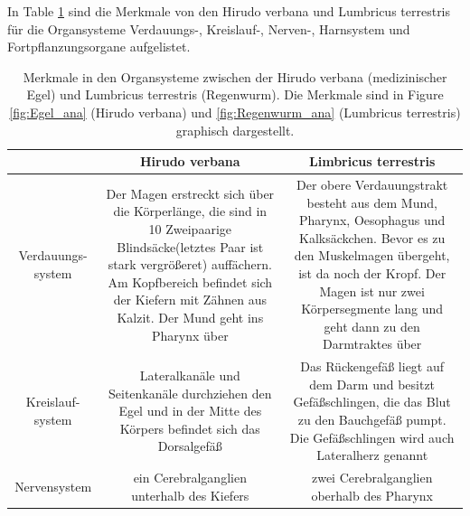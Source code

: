 \documentclass[oneside,10pt,a4paper]{report}
\begin{document}
				In Table \ref{tab: Egel vs Regenwurm} sind die Merkmale von den Hirudo verbana und Lumbricus terrestris für die Organsysteme Verdauungs-, Kreislauf-, Nerven-, Harnsystem und Fortpflanzungsorgane aufgelistet. 
				\begin{table}[H]
					\centering
					\caption{Merkmale in den Organsysteme zwischen der Hirudo verbana (medizinischer Egel) und Lumbricus terrestris (Regenwurm). Die Merkmale sind in Figure \ref{fig:Egel_ana} (Hirudo verbana) und \ref{fig:Regenwurm_ana} (Lumbricus terrestris) graphisch dargestellt.}
					\label{tab: Egel vs Regenwurm}
					\begin{tabular}{c c c}
						\toprule
						& Hirudo verbana & Limbricus terrestris\\
						\midrule
						\multirow{7}{*}{\parbox[t]{2cm}{Verdauungs- system}} & \multirow{7}{*}{\parbox[t]{6cm}{Der Magen erstreckt sich über die Körperlänge, die sind in 10 Zweipaarige Blindsäcke(letztes Paar ist stark vergrößeret) auffächern. Am Kopfbereich befindet sich der Kiefern mit Zähnen aus Kalzit. Der Mund geht ins Pharynx über}}&\multirow{7}{*}{\parbox[t]{6cm}{Der obere Verdauungstrakt besteht aus dem Mund, Pharynx, Oesophagus und Kalksäckchen. Bevor es zu den Muskelmagen übergeht, ist da noch der Kropf. Der Magen ist nur zwei Körpersegmente lang und geht dann zu den Darmtraktes über}}\\
						&&\\
						&&\\
						&&\\
						&&\\
						&&\\
						&&\\
						\midrule
						\multirow{5}{*}{\parbox[t]{2cm}{Kreislauf- system}}& \multirow{5}{*}{\parbox[t]{6cm}{Lateralkanäle und Seitenkanäle durchziehen den Egel und in der Mitte des Körpers befindet sich das Dorsalgefäß}}&\multirow{5}{*}{\parbox[t]{6cm}{Das Rückengefäß liegt auf dem Darm und besitzt Gefäßschlingen, die das Blut zu den Bauchgefäß pumpt. Die Gefäßschlingen wird auch Lateralherz genannt}}\\	
						& &\\
						&&\\
						&&\\
						&&\\
						\midrule
						\multirow{2}{*}{\parbox[t]{2cm}{Nervensystem}} & \multirow{2}{*}{\parbox[t]{6cm}{ein Cerebralganglien unterhalb des Kiefers}}&\multirow{2}{*}{\parbox[t]{6cm}{zwei Cerebralganglien oberhalb des Pharynx}}\\

\end{tabular}
\end{table}
\end{document}
